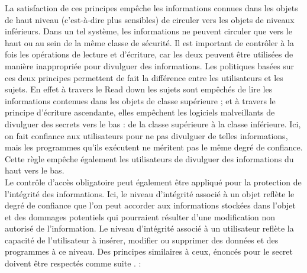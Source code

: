 \hspace*{0.5cm} La satisfaction de ces principes empêche les informations connues dans les objets de haut niveau (c'est-à-dire plus sensibles) de circuler vers les objets de niveaux inférieurs. Dans un tel système, les informations ne peuvent circuler que vers le haut ou au sein de la même classe de sécurité. Il est important de contrôler à la fois les opérations de lecture et d'écriture, car les deux peuvent être utilisées de manière inappropriée pour divulguer des informations. Les politiques basées sur ces deux principes permettent de fait la différence entre les utilisateurs et les sujets. En effet à travers le Read down les sujets sont empêchés de lire les informations contenues dans les objets de classe supérieure ; et à travers le principe d'écriture ascendante, elles empêchent les logiciels malveillants de divulguer des secrets vers le bas : de la classe supérieure à la classe inférieure. Ici, on fait confiance aux utilisateurs pour ne pas divulguer de telles informations, mais les programmes qu'ils exécutent ne méritent pas le même degré de confiance. Cette règle empêche également les utilisateurs de divulguer des informations du haut vers le bas. \\
\hspace*{0.5cm} Le contrôle d'accès obligatoire peut également être appliqué pour la protection de l'intégrité des informations. Ici, le niveau d'intégrité associé à un objet reflète le degré de confiance que l'on peut accorder aux informations stockées dans l'objet et des dommages potentiels qui pourraient résulter d'une modification non autorisé de l'information. Le niveau d'intégrité associé à un utilisateur reflète la capacité de l'utilisateur à insérer, modifier ou supprimer des données et des programmes à ce niveau. Des principes similaires à ceux, énoncés pour le secret doivent être respectés comme suite \cite{sandhu94}. : 
